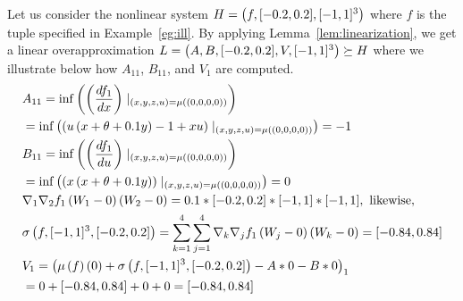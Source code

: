 %
\begin{example}
Let us consider the nonlinear system $H = \left(f,[-0.2,0.2],[-1,1]^3\right)$
where $f$ is the tuple specified in Example~\ref{eg:ill}.  By applying
Lemma~\ref{lem:linearization}, we get a linear overapproximation $L
= \left(A,B,[-0.2,0.2],V,[-1,1]^3\right)\succeq H$ where we illustrate below
how $A_{11}$, $B_{11}$, and $V_{1}$ are computed.
%
\begin{align*}
& A_{11} = \inf\rb{\rb{\frac{df_1}{dx}}\mid_{\rb{x,y,z,u} =
\ivmat{(0,0,0,0)}}} \\ & = \inf\rb{\rb{u\rb{ x + \theta + 0.1y } - 1 +
xu}\mid_{\rb{x,y,z,u} = \ivmat{(0,0,0,0)}}} = -1 \\
%
& B_{11} = \inf\rb{\rb{\frac{df_1}{du}}\mid_{\rb{x,y,z,u} =
\ivmat{(0,0,0,0)}}} \\ &= \inf\rb{\rb{x\rb{ x + \theta + 0.1y
}}\mid_{\rb{x,y,z,u} = \ivmat{(0,0,0,0)}}} = 0 \\
%
& \nabla_1\nabla_2f_1\rb{W_1-0}\rb{W_2-0} =
0.1*[-0.2,0.2]*[-1,1]*[-1,1],~\text{likewise},\\
& \taylor{f}{[-1,1]^3}{[-0.2,0.2]}
= \sum_{k=1}^4\sum_{j=1}^4\nabla_k\nabla_jf_1\rb{W_j-0}\rb{W_k-0}
= [-0.84, 0.84]\\
%
& V_1 = \rb{\iv{f}{ 0 }
+ \taylor{f}{[-1,1]^3}{[-0.2,0.2]}
- A*0 - B*0}_1 \\
& = 0 + [-0.84,0.84] + 0 + 0 = [-0.84, 0.84]
\end{align*}
%
\end{example}
%
